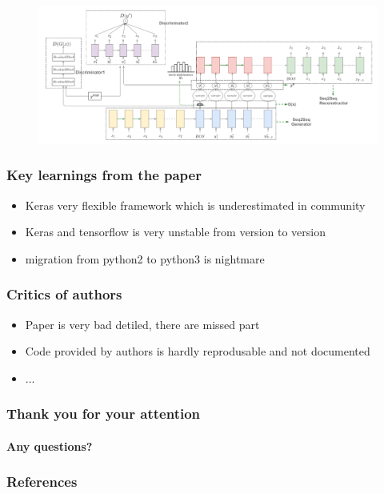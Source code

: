 \documentclass{tum-presentation}
\begin{document}
\begin{frame}
	\begin{figure}
		\centering
		\includegraphics[width=1\textwidth,keepaspectratio=true]{tum-resources/images/paper_3.png}
		\label{fig:paper_3}
	\end{figure}
\end{frame}

\begin{frame}
	\frametitle{Key learnings from the paper}
	\begin{itemize}
		\item Keras very flexible framework which is underestimated in community
		\item Keras and tensorflow is very unstable from version to version
		\item migration from python2 to python3 is nightmare 
	\end{itemize}
\end{frame}

\begin{frame}
	\frametitle{Critics of authors}
	\begin{itemize}
		\item Paper is very bad detiled, there are missed part
		\item Code provided by authors is hardly reprodusable and not documented
		\item ...
	\end{itemize}
\end{frame}

\begin{frame}
	\frametitle{Thank you for your attention}
	\framesubtitle{Any questions?}
\end{frame}

\begin{frame}
	\frametitle{References}
	\printbibliography
\end{frame}
\end{document}
